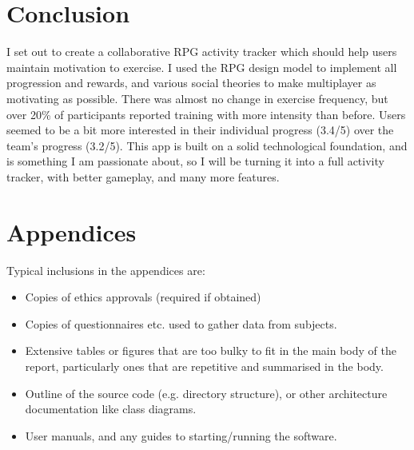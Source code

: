 \documentclass{l4proj}
\begin{document}
\chapter{Conclusion}    
I set out to create a collaborative RPG activity tracker which should help users maintain motivation to exercise. I used the RPG design model to implement all progression and rewards, and various social theories to make multiplayer as motivating as possible. There was almost no change in exercise frequency, but over 20\% of participants reported training with more intensity than before. Users seemed to be a bit more interested in their individual progress (3.4/5) over the team's progress (3.2/5). This app is built on a solid technological foundation, and is something I am passionate about, so I will be turning it into a full activity tracker, with better gameplay, and many more features.







\chapter{Appendices}

Typical inclusions in the appendices are:

\begin{itemize}
\item
  Copies of ethics approvals (required if obtained)
\item
  Copies of questionnaires etc. used to gather data from subjects.
\item
  Extensive tables or figures that are too bulky to fit in the main body of
  the report, particularly ones that are repetitive and summarised in the body.

\item Outline of the source code (e.g. directory structure), or other architecture documentation like class diagrams.

\item User manuals, and any guides to starting/running the software.

\end{itemize}
\end{document}
